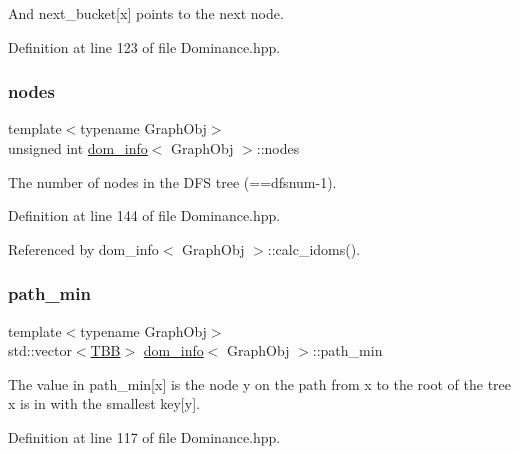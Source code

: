 And next\+\_\+bucket\mbox{[}x\mbox{]} points to the next node. 



Definition at line 123 of file Dominance.\+hpp.

\mbox{\label{classdom__info_a48d909fc0cc96cb7c2f2f8c4bf766927}} 
\subsubsection{\texorpdfstring{nodes}{nodes}}
{\footnotesize\ttfamily template$<$typename Graph\+Obj$>$ \\
unsigned int \hyperlink{classdom__info}{dom\+\_\+info}$<$ Graph\+Obj $>$\+::nodes\hspace{0.3cm}{\ttfamily [private]}}



The number of nodes in the D\+FS tree (==dfsnum-\/1). 



Definition at line 144 of file Dominance.\+hpp.



Referenced by dom\+\_\+info$<$ Graph\+Obj $>$\+::calc\+\_\+idoms().

\mbox{\label{classdom__info_a5ebfc0d7c9b3a71e3e085cd4f042ea29}} 
\subsubsection{\texorpdfstring{path\+\_\+min}{path\_min}}
{\footnotesize\ttfamily template$<$typename Graph\+Obj$>$ \\
std\+::vector$<$\hyperlink{Dominance_8hpp_ac35ffd4ddeccae8225d6ec6f55d65a97}{T\+BB}$>$ \hyperlink{classdom__info}{dom\+\_\+info}$<$ Graph\+Obj $>$\+::path\+\_\+min\hspace{0.3cm}{\ttfamily [private]}}



The value in path\+\_\+min\mbox{[}x\mbox{]} is the node y on the path from x to the root of the tree x is in with the smallest key\mbox{[}y\mbox{]}. 



Definition at line 117 of file Dominance.\+hpp.

